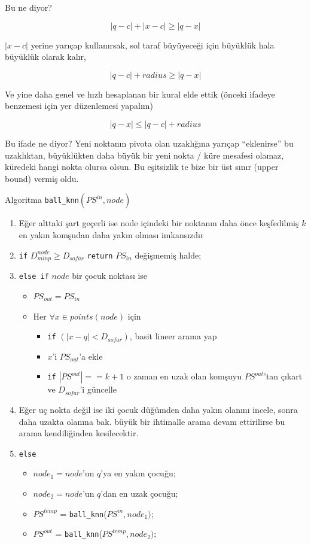 \documentclass[12pt,fleqn]{article}\usepackage{../../common}
\begin{document}
Bu ne diyor? 

$$ |q-c| + |x-c| \ge |q-x| $$

$|x-c|$ yerine yarıçap kullanırsak, sol taraf büyüyeceği için büyüklük hala
büyüklük olarak kalır, 

$$ |q-c| + radius \ge |q-x| $$

Ve yine daha genel ve hızlı hesaplanan bir kural elde ettik (önceki
ifadeye benzemesi için yer düzenlemesi yapalım)

$$ |q-x| \le |q-c| + radius $$

Bu ifade ne diyor? Yeni noktanın pivota olan uzaklığına yarıçap
``eklenirse'' bu uzaklıktan, büyüklükten daha büyük bir yeni nokta / küre
 mesafesi olamaz, küredeki hangi nokta olursa olsun. Bu eşitsizlik te bize
 bir üst sınır (upper bound) vermiş oldu. 

Algoritma \verb!ball_knn!$\left(PS^{in},node\right)$
\begin{enumerate}

\item Eğer alttaki şart geçerli ise node içindeki bir noktanın daha önce
  keşfedilmiş $k$ en yakın komşudan daha yakın olması imkansızdır

\item \verb!if! $D^{node}_{minp} \ge D_{sofar}$ \verb!return!  $PS_{in}$
  değişmemiş halde;

\item \verb!else if! $node$ bir çocuk noktası ise

  \begin{itemize}
   \item  $PS_{out} = PS_{in}$
   \item Her $\forall x \in points(node)$ için
   \begin{itemize}
     \item \verb!if! $\left( |x-q| < D_{sofar} \right)$, basit lineer arama yap
     \item $x$'i $PS_{out}$'a ekle
     \item \verb!if! $|PS^{out}| == k+1$ o zaman en uzak olan komşuyu
       $PS^{out}$'tan çıkart ve $D_{sofar}$'i güncelle
   \end{itemize}

  \end{itemize}

\item Eğer uç nokta değil ise iki çocuk düğümden daha yakın olanını
  incele, sonra daha uzakta olanına bak. büyük bir ihtimalle arama devam
  ettirilirse bu arama kendiliğinden kesilecektir.

  \item \verb!else!
    \begin{itemize}
      \item $node_1 = node$'un $q$'ya en yakın çocuğu;
      \item $node_2 = node$'un $q$'dan en uzak çocuğu;
      \item $PS^{temp}$ = \verb!ball_knn!($PS^{in},node_1)$;
      \item $PS^{out}$ = \verb!ball_knn!($PS^{temp},node_2);$
\end{itemize}
        
\end{enumerate}
\end{document}
